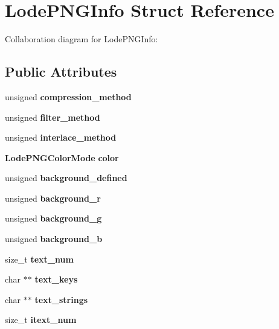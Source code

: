 \section{Lode\+P\+N\+G\+Info Struct Reference}
\label{struct_lode_p_n_g_info}


Collaboration diagram for Lode\+P\+N\+G\+Info\+:
\subsection*{Public Attributes}
\begin{DoxyCompactItemize}
\item 
\mbox{\label{struct_lode_p_n_g_info_a42bcacd0dbaaea01c04cc87b58ac3c1d}} 
unsigned {\bfseries compression\+\_\+method}
\item 
\mbox{\label{struct_lode_p_n_g_info_a5098d6e8aa528d5197f51914439633b9}} 
unsigned {\bfseries filter\+\_\+method}
\item 
\mbox{\label{struct_lode_p_n_g_info_a80207e3e53c959b2285636496a3dd3f1}} 
unsigned {\bfseries interlace\+\_\+method}
\item 
\mbox{\label{struct_lode_p_n_g_info_a0af9bab3435084780ce8c1cb69bb2628}} 
\textbf{ Lode\+P\+N\+G\+Color\+Mode} {\bfseries color}
\item 
\mbox{\label{struct_lode_p_n_g_info_aa94c65344af02472adb9c71eae2e765f}} 
unsigned {\bfseries background\+\_\+defined}
\item 
\mbox{\label{struct_lode_p_n_g_info_a98b59c3760bda184bb16c9713b430bc3}} 
unsigned {\bfseries background\+\_\+r}
\item 
\mbox{\label{struct_lode_p_n_g_info_abf638e191edaeaa2b02c371a381e3a89}} 
unsigned {\bfseries background\+\_\+g}
\item 
\mbox{\label{struct_lode_p_n_g_info_a994de0c74ef1092f056ff534e00dfa0d}} 
unsigned {\bfseries background\+\_\+b}
\item 
\mbox{\label{struct_lode_p_n_g_info_a393e0b3948ca6674232e1cc625db282e}} 
size\+\_\+t {\bfseries text\+\_\+num}
\item 
\mbox{\label{struct_lode_p_n_g_info_a0a26147c9673870dd122693f17a69b13}} 
char $\ast$$\ast$ {\bfseries text\+\_\+keys}
\item 
\mbox{\label{struct_lode_p_n_g_info_aac321d27e65c54e56d6092d3a6400a81}} 
char $\ast$$\ast$ {\bfseries text\+\_\+strings}
\item 
\mbox{\label{struct_lode_p_n_g_info_a22166bb10c89a4d80e206d6c4736b625}} 
size\+\_\+t {\bfseries itext\+\_\+num}

\end{DoxyCompactItemize}
